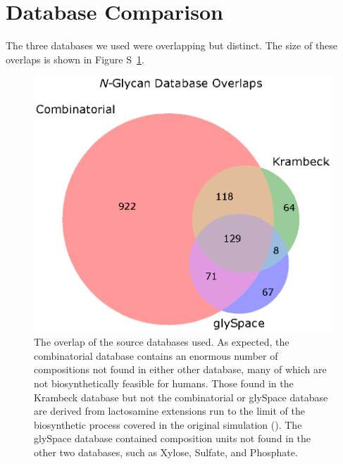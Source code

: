 \section{Database Comparison}\label{sec:database_comparison}
The three databases we used were overlapping but distinct. The size of these
overlaps is shown in Figure S~\ref{fig:database_overlap}.

\begin{figure}[!h]
    \includegraphics[width=.95\linewidth]{figure/database-venndiagram.eps}
    \caption{The overlap of the source databases used\label{fig:database_overlap}.
    As expected, the combinatorial database contains an enormous number of
    compositions not found in either other database, many of which are not
    biosynthetically feasible for humans. Those found in the Krambeck database but
    not the combinatorial or glySpace database are derived from lactosamine extensions
    run to the limit of the biosynthetic process covered in the original simulation
    (\citealp{Krambeck2005}). The glySpace database contained composition units not
    found in the other two databases, such as Xylose, Sulfate, and Phosphate.}
\end{figure}
